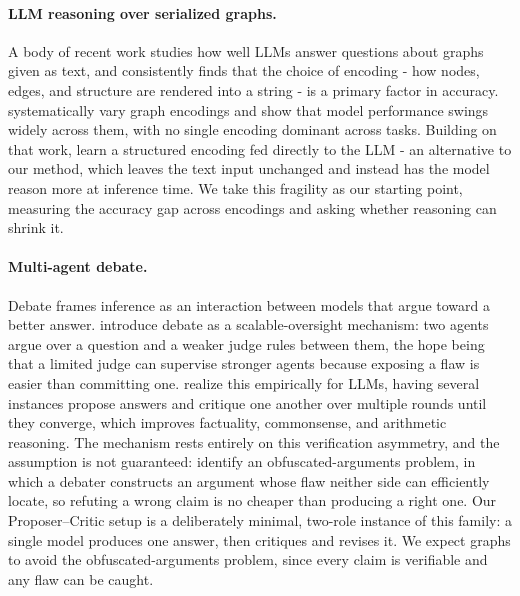 \documentclass[11pt]{article}
\begin{document}
\paragraph{LLM reasoning over serialized graphs.}
A body of recent work studies how well LLMs answer questions about graphs given as
text, and consistently finds that the choice of encoding - how nodes,
edges, and structure are rendered into a string - is a primary factor in
accuracy. \citet{fatemi2024talk} systematically vary graph encodings and show that
model performance swings widely across them, with no single encoding dominant
across tasks. Building on that work, \citet{perozzi2024graphtoken} learn a
structured encoding fed directly to the LLM - an alternative to our method, which
leaves the text input unchanged and instead has the model reason more at inference
time. We take this fragility as our starting point, measuring the accuracy gap
across encodings and asking whether reasoning can shrink it. %

\paragraph{Multi-agent debate.}
Debate frames inference as an interaction between models that argue toward a
better answer. \citet{irving2018debate} introduce debate as a scalable-oversight
mechanism: two agents argue over a question and a weaker judge rules between them,
the hope being that a limited judge can supervise stronger agents because exposing
a flaw is easier than committing one. \citet{du2023debate} realize this empirically
for LLMs, having several instances propose answers and critique one another over
multiple rounds until they converge, which improves factuality, commonsense, and
arithmetic reasoning. The mechanism rests entirely on this verification asymmetry,
and the assumption is not guaranteed: \citet{barnes2020obfuscated} identify an
obfuscated-arguments problem, in which a debater constructs an argument whose flaw
neither side can efficiently locate, so refuting a wrong claim is no cheaper than
producing a right one. Our Proposer--Critic setup is a deliberately minimal,
two-role instance of this family: a single model produces one answer, then
critiques and revises it. We expect graphs to avoid the obfuscated-arguments
problem, since every claim is verifiable and any flaw can be caught.
\end{document}
